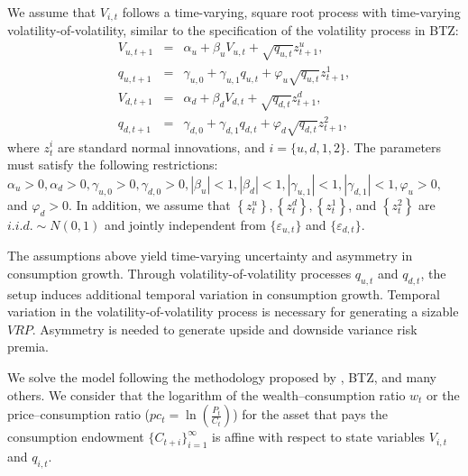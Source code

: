 \documentclass[11pt]{article}
\begin{document}
We assume that $V_{i,t}$ follows a time-varying, square root process with
time-varying volatility-of-volatility, similar to the specification of the volatility process in BTZ:
\begin{eqnarray}
V_{u,t+1} &=& \alpha_u+\beta_u V_{u,t}+\sqrt{q_{u,t}}z^u_{t+1}, \\
q_{u, t+1} &=& \gamma_{u,0}+\gamma_{u,1}q_{u,t}+\varphi_u\sqrt{q_{u,t}}%
z^1_{t+1}, \\
V_{d,t+1} &=& \alpha_d+\beta_d V_{d,t}+\sqrt{q_{d,t}}z^d_{t+1}, \\
q_{d, t+1} &=& \gamma_{d,0}+\gamma_{d,1}q_{d,t}+\varphi_d\sqrt{q_{d,t}}%
z^2_{t+1},
\end{eqnarray}
where $z^i_{t}$ are standard normal innovations, and $i=\{u, d, 1, 2\}$. The
parameters must satisfy the following restrictions: $\alpha_u >0, \alpha_d >0,
\gamma_{u,0}>0, \gamma_{d,0}>0, |\beta_u|<1, |\beta_d|<1, |\gamma_{u,1}|<1,
|\gamma_{d,1}|<1, \varphi_u>0,$ and $ \varphi_d>0$. In addition, we assume that $%
\left\{z^u_{t}\right\}, \left\{z^d_{t}\right\}, \left\{z^1_{t}\right\}$, and $%
\left\{z^2_{t}\right\}$ are $i.i.d. \sim N(0,1)$ and
jointly independent from $\{\varepsilon_{u,t}\}$ and $\{\varepsilon_{d,t}\}$.

The assumptions above yield time-varying uncertainty and asymmetry in
consumption growth. Through volatility-of-volatility processes $q_{u,t}$ and
$q_{d,t}$, the setup induces additional temporal variation in consumption
growth. Temporal variation in the volatility-of-volatility process is necessary
for generating a sizable $VRP$. Asymmetry is needed to generate
upside and downside variance risk premia.

We solve the model following the methodology proposed by \cite{BansalYaron04JF}, BTZ, and many others. We consider that the logarithm of the wealth--consumption ratio $w_t$ or the
price--consumption ratio ($pc_t=\ln\left(\frac{P_t}{C_t}\right)$) for the
asset that pays the consumption endowment $\{C_{t+i}\}_{i=1}^\infty$ is affine with respect to state variables $V_{i,t}$ and $q_{i,t}$.
\end{document}
